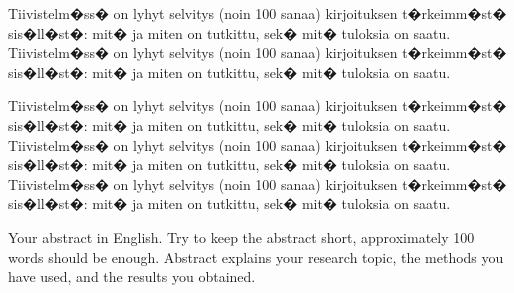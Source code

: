 \documentclass[finnish,12pt,a4paper,pdftex]{article}
\begin{document}


\makecoverpage


\begin{abstractpage}[finnish]
  Tiivistelm�ss� on lyhyt selvitys (noin 100 sanaa)
  kirjoituksen t�rkeimm�st� sis�ll�st�: mit� ja miten on tutkittu,
  sek� mit� tuloksia on saatu. 
  Tiivistelm�ss� on lyhyt selvitys (noin 100 sanaa)
  kirjoituksen t�rkeimm�st� sis�ll�st�: mit� ja miten on tutkittu,
  sek� mit� tuloksia on saatu. 

  Tiivistelm�ss� on lyhyt selvitys (noin 100 sanaa)
  kirjoituksen t�rkeimm�st� sis�ll�st�: mit� ja miten on tutkittu,
  sek� mit� tuloksia on saatu. 
  Tiivistelm�ss� on lyhyt selvitys (noin 100 sanaa)
  kirjoituksen t�rkeimm�st� sis�ll�st�: mit� ja miten on tutkittu,
  sek� mit� tuloksia on saatu. 
  Tiivistelm�ss� on lyhyt selvitys (noin 100 sanaa)
  kirjoituksen t�rkeimm�st� sis�ll�st�: mit� ja miten on tutkittu,
  sek� mit� tuloksia on saatu. 
\end{abstractpage}

\newpage
%
\begin{abstractpage}[english]
 Your abstract in English. Try to keep the abstract short, approximately 
 100 words should be enough. Abstract explains your research topic, 
 the methods you have used, and the results you obtained.  
\end{abstractpage}
\end{document}

